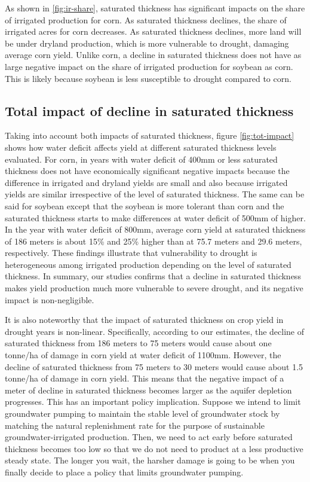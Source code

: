 \documentclass[
]{article}
\begin{document}
As shown in \ref{fig:ir-share}, saturated thickness has significant impacts on the share of irrigated production for corn. As saturated thickness declines, the share of irrigated acres for corn decreases. As saturated thickness declines, more land will be under dryland production, which is more vulnerable to drought, damaging average corn yield. Unlike corn, a decline in saturated thickness does not have as large negative impact on the share of irrigated production for soybean as corn. This is likely because soybean is less susceptible to drought compared to corn.

\hypertarget{total-impact-of-decline-in-saturated-thickness}{%
\subsection{Total impact of decline in saturated thickness}\label{total-impact-of-decline-in-saturated-thickness}}

Taking into account both impacts of saturated thickness, figure \ref{fig:tot-impact} shows how water deficit affects yield at different saturated thickness levels evaluated. For corn, in years with water deficit of 400mm or less saturated thickness does not have economically significant negative impacts because the difference in irrigated and dryland yields are small and also because irrigated yields are similar irrespective of the level of saturated thickness. The same can be said for soybean except that the soybean is more tolerant than corn and the saturated thickness starts to make differences at water deficit of 500mm of higher. In the year with water deficit of 800mm, average corn yield at saturated thickness of 186 meters is about 15\% and 25\% higher than at 75.7 meters and 29.6 meters, respectively. These findings illustrate that vulnerability to drought is heterogeneous among irrigated production depending on the level of saturated thickness. In summary, our studies confirms that a decline in saturated thickness makes yield production much more vulnerable to severe drought, and its negative impact is non-negligible.

It is also noteworthy that the impact of saturated thickness on crop yield in drought years is non-linear. Specifically, according to our estimates, the decline of saturated thickness from 186 meters to 75 meters would cause about one tonne/ha of damage in corn yield at water deficit of 1100mm. However, the decline of saturated thickness from 75 meters to 30 meters would cause about 1.5 tonne/ha of damage in corn yield. This means that the negative impact of a meter of decline in saturated thickness becomes larger as the aquifer depletion progresses. This has an important policy implication. Suppose we intend to limit groundwater pumping to maintain the stable level of groundwater stock by matching the natural replenishment rate for the purpose of sustainable groundwater-irrigated production. Then, we need to act early before saturated thickness becomes too low so that we do not need to product at a less productive steady state. The longer you wait, the harsher damage is going to be when you finally decide to place a policy that limits groundwater pumping.
\end{document}

